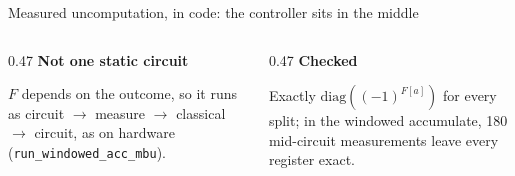 \documentclass[aspectratio=169,11pt]{beamer}
\newcommand{\blocktitle}[1]{{\bfseries #1}\par\vskip1mm}
\newcommand{\code}[2][]{}
\begin{document}
\begin{frame}[fragile]{Measured uncomputation, in code: the controller sits in the middle}
  \code[basicstyle=\ttfamily\footnotesize]{phase_fixup.py}
  \begin{columns}[T]
    \begin{column}{0.47\textwidth}
      \blocktitle{Not one static circuit}
      $F$ depends on the outcome, so it runs as circuit $\to$ measure $\to$ classical $\to$ circuit, as on hardware (\texttt{run\_windowed\_acc\_mbu}).
    \end{column}
    \begin{column}{0.47\textwidth}
      \blocktitle{Checked}
      Exactly $\mathrm{diag}((-1)^{F[a]})$ for every split; in the windowed accumulate, 180 mid-circuit measurements leave every register exact.
    \end{column}
  \end{columns}
\end{frame}
\end{document}
